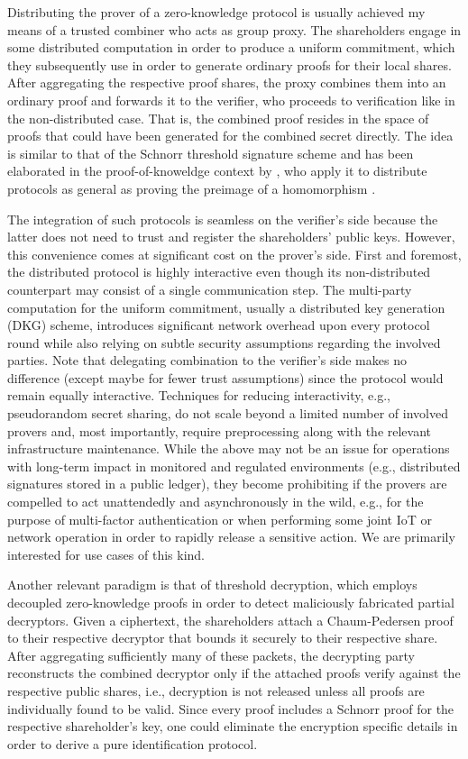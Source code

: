\documentclass{iacrtrans}
\begin{document}
Distributing the prover of a zero-knowledge protocol
is usually achieved my means of a trusted combiner
who acts as group proxy.
The shareholders engage in some distributed computation
in order to produce a uniform commitment,
which they subsequently use in order to generate
ordinary proofs for their local shares.
After aggregating
the respective proof shares,
the proxy combines them into an ordinary proof
and forwards it to the verifier,
who proceeds to verification like in the non-distributed case.
That is, the combined proof resides in the space of proofs
that could have been generated for the combined secret directly.
The idea is similar to that of the
Schnorr threshold signature scheme
\cite{paper_stinson_strobl}
and has been elaborated
in the proof-of-knoweldge context by \cite{paper_threshold_zk},
who apply it to distribute protocols as general as
proving the preimage of a homomorphism \cite{paper_homomorphism}.

The integration of such protocols
is seamless on the verifier's side
because the latter does not need
to trust and register the shareholders' public keys.
However, this convenience comes at significant cost on the prover's side.
First and foremost, the distributed protocol
is highly interactive even though its non-distributed
counterpart may consist of a single communication step.
The multi-party computation
for the uniform commitment,
usually a distributed key generation (DKG) scheme,
introduces significant network overhead upon every protocol round
while also relying on subtle
security assumptions regarding the involved parties.
Note that delegating combination
to the verifier's side makes no difference
(except maybe for fewer trust assumptions)
since the protocol would remain equally interactive.
Techniques for reducing interactivity,
e.g., pseudorandom secret sharing, do not scale beyond
a limited number of involved provers and,
most importantly, require preprocessing
along with the relevant infrastructure maintenance.
While the above may not be an issue
for operations with long-term impact
in monitored and regulated environments
(e.g., distributed signatures stored in a public ledger),
they become prohibiting if the provers
are compelled to act unattendedly and asynchronously
in the wild,
e.g., for the purpose of multi-factor authentication
or when performing some joint IoT or network operation
in order to rapidly release a sensitive action.
We are primarily interested for use cases of this kind.

Another relevant paradigm is that of threshold decryption,
which employs decoupled zero-knowledge proofs
in order to detect maliciously fabricated partial decryptors.
Given a ciphertext, the shareholders attach
a Chaum-Pedersen proof to their respective decryptor
that bounds it securely to their respective share.
After aggregating sufficiently many of these packets,
the decrypting party reconstructs the combined decryptor
only if the attached proofs verify against the respective
public shares, i.e., decryption is not released
unless all proofs are individually found to be valid.
Since every proof
includes a Schnorr proof for the respective shareholder's key,
one could eliminate the encryption specific details
in order to derive a pure identification protocol.
\end{document}

